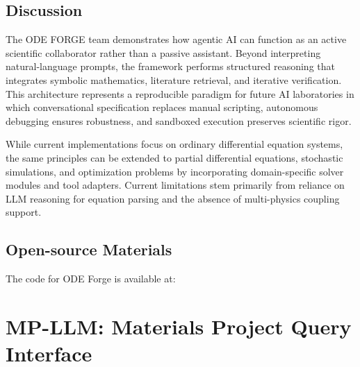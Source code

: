 \subsection*{Discussion}

The ODE FORGE team demonstrates how agentic AI can function as an active scientific collaborator \cite{Decardi_Nelson_2024,Boiko2023} rather than a passive assistant. Beyond interpreting natural-language prompts, the framework performs structured reasoning that integrates symbolic mathematics, literature retrieval, and iterative verification. This architecture represents a reproducible paradigm for future AI laboratories in which conversational specification replaces manual scripting, autonomous debugging ensures robustness, and sandboxed execution preserves scientific rigor.

While current implementations focus on ordinary differential equation systems, the same principles can be extended to partial differential equations, stochastic simulations, and optimization problems by incorporating domain-specific solver modules and tool adapters. Current limitations stem primarily from reliance on LLM reasoning for equation parsing and the absence of multi-physics coupling support.

\subsection*{Open-source Materials}

The code for ODE Forge is available at: 







\section{MP-LLM: Materials Project Query Interface}


